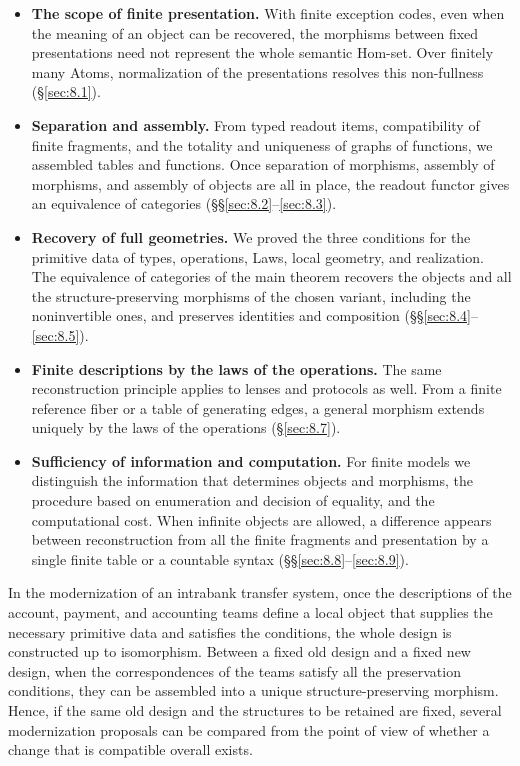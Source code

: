 \begin{itemize}
\item \textbf{The scope of finite presentation.} With finite exception codes, even when the
meaning of an object can be recovered, the morphisms between fixed presentations need not
represent the whole semantic Hom-set.
Over finitely many Atoms, normalization of the presentations resolves this non-fullness
(\S\ref{sec:8.1}).
\item \textbf{Separation and assembly.} From typed readout items, compatibility of finite
fragments, and the totality and uniqueness of graphs of functions, we assembled tables and
functions.
Once separation of morphisms, assembly of morphisms, and assembly of objects are all in place,
the readout functor gives an equivalence of categories (\S\S\ref{sec:8.2}--\ref{sec:8.3}).
\item \textbf{Recovery of full geometries.} We proved the three conditions for the primitive
data of types, operations, Laws, local geometry, and realization.
The equivalence of categories of the main theorem recovers the objects and all the
structure-preserving morphisms of the chosen variant, including the noninvertible ones, and
preserves identities and composition (\S\S\ref{sec:8.4}--\ref{sec:8.5}).
\item \textbf{Finite descriptions by the laws of the operations.} The same reconstruction
principle applies to lenses and protocols as well.
From a finite reference fiber or a table of generating edges, a general morphism extends
uniquely by the laws of the operations (\S\ref{sec:8.7}).
\item \textbf{Sufficiency of information and computation.} For finite models we distinguish the
information that determines objects and morphisms, the procedure based on enumeration and
decision of equality, and the computational cost.
When infinite objects are allowed, a difference appears between reconstruction from all the
finite fragments and presentation by a single finite table or a countable syntax
(\S\S\ref{sec:8.8}--\ref{sec:8.9}).
\end{itemize}

In the modernization of an intrabank transfer system, once the descriptions of the account, payment,
and accounting teams define a local object that supplies the necessary primitive data
and satisfies the conditions, the whole design is constructed up to isomorphism.
Between a fixed old design and a fixed new design, when the correspondences of the teams
satisfy all the preservation conditions, they can be assembled into a unique
structure-preserving morphism.
Hence, if the same old design and the structures to be retained are fixed, several
modernization proposals can be compared from the point of view of whether a change that is
compatible overall exists.
